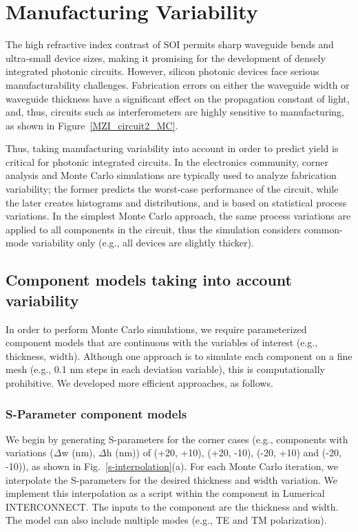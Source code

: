 \documentclass[journal]{spie}
\begin{document}
\section{Manufacturing Variability}
\label{sec:variability}
The high refractive index contrast of SOI permits sharp waveguide bends and ultra-small device sizes, making it promising for the development of densely integrated photonic circuits. However, silicon photonic devices face serious manufacturability challenges. Fabrication errors on either the waveguide width or waveguide thickness have a significant effect on the propagation constant of light, and, thus, circuits such as interferometers are highly sensitive to manufacturing, as shown in Figure~\ref{MZI_circuit2_MC}.

Thus, taking manufacturing variability into account in order to predict yield is critical for photonic integrated circuits. In the electronics community, corner analysis and Monte Carlo simulations are typically used to analyze fabrication variability; the former predicts the worst-case performance of the circuit, while the later creates histograms and distributions, and is based on statistical process variations.  In the simplest Monte Carlo approach, the same process variations are applied to all components in the circuit, thus the simulation considers common-mode variability only (e.g., all devices are slightly thicker).  

\subsection{Component models taking into account variability}
In order to perform Monte Carlo simulations, we require parameterized component models that are continuous with the variables of interest (e.g., thickness, width).  Although one approach is to simulate each component on a fine mesh (e.g., 0.1 nm steps in each deviation variable), this is computationally prohibitive.  We developed more efficient approaches, as follows.

\subsubsection{S-Parameter component models}
\label{SparamModel}
We begin by generating S-parameters for the corner cases (e.g., components with variations ($\Delta$w (nm), $\Delta$h (nm)) of (+20, +10), (+20, -10), (-20, +10) and (-20, -10)), as shown in Fig.~\ref{s-interpolation}(a).  For each Monte Carlo iteration, we interpolate the S-parameters for the desired thickness and width variation.  We implement this interpolation as a script within the component in Lumerical INTERCONNECT.  The inputs to the component are the thickness and width.
The model can also include multiple modes (e.g., TE and TM polarization).
\end{document}
